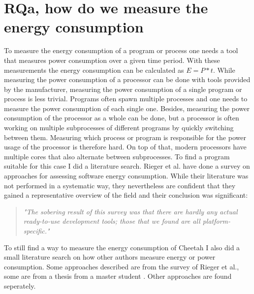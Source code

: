 \documentclass[../thesis.tex]{subfiles}
\begin{document}
\section{RQa, how do we measure the energy consumption}
To measure the energy consumption of a program or process one needs a tool that measures power consumption over a given time period. With these measurements the energy consumption can be calculated as $E=P*t$. While measuring the power consumption of a processor can be done with tools provided by the manufacturer, measuring the power consumption of a single program or process is less trivial. Programs often spawn multiple processes and one needs to measure the power consumption of each single one.  Besides, measuring the power consumption of the processor as a whole can be done, but a processor is often working on multiple subprocesses of different programs by quickly switching between them. Measuring which process or program is responsible for the power usage of the processor is therefore hard. On top of that, modern processors have multiple cores that also alternate between subprocesses. To find a program suitable for this case I did a literature search. Rieger et al. have done a survey on approaches for assessing software energy consumption. While their literature was not performed in a systematic way, they nevertheless are confident that they gained a representative overview of the field and their conclusion was significant:

\begin{quote}
    \emph{"The sobering result of this survey was that there are hardly any actual ready-to-use development tools; those that we found are all platform-specific."} \parencite[p. 24]{rieger2017}
\end{quote}

To still find a way to measure the energy consumption of Cheetah I also did a small literature search on how other authors measure energy or power consumption. Some approaches described are from the survey of Rieger et al., some are from a thesis from a master student \parencite{strempel2021}. Other approaches are found seperately. \paragraph{}
\end{document}
